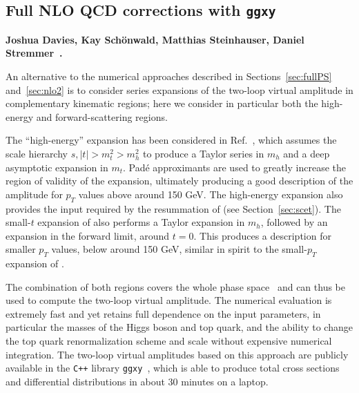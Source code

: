 \subsection{Full NLO QCD corrections with \textbf{\texttt{ggxy}}}


\textbf{Joshua Davies, Kay Schönwald, Matthias Steinhauser, Daniel Stremmer~\cite{Davies:2018qvx,Davies:2023vmj,Davies:2025qjr}.}

\noindent An alternative to the numerical approaches described in Sections~\ref{sec:fullPS} and~\ref{sec:nlo2} is to consider series
expansions of the two-loop virtual amplitude in complementary kinematic regions; here we consider in particular both the high-energy and forward-scattering regions.

The
``high-energy'' expansion has been considered in Ref.~\cite{Davies:2018qvx}, which assumes the
scale hierarchy $s,|t| > m_t^2 > m_h^2$ to produce a Taylor series in $m_h$ and a deep
asymptotic expansion in $m_t$. Pad\'e approximants are used to greatly increase
the region of validity of the expansion, ultimately producing a good description
of the amplitude for $p_T$ values above around 150 GeV. The high-energy expansion
also provides the input required by the resummation of \cite{Jaskiewicz:2024xkd}
(see Section~\ref{sec:scet}).
%
The small-$t$ expansion of \cite{Davies:2023vmj} also performs a Taylor expansion
in $m_h$, followed by an expansion in the forward limit, around $t=0$. This
produces a description for smaller $p_T$ values, below around 150 GeV, similar in
spirit to the small-$p_T$ expansion of \cite{Bonciani:2018omm}.

The combination of both regions
covers the whole phase space~\cite{Davies:2023vmj} and can
thus be used to compute the two-loop
virtual amplitude. The numerical evaluation
is
extremely fast and yet retains full dependence on the input parameters,
in particular the masses of the Higgs boson and top quark, and the ability to change
the top quark renormalization scheme and scale without expensive numerical integration.
The two-loop virtual amplitudes based on this approach are publicly available in the \texttt{C++}
library \texttt{ggxy}~\cite{Davies:2025qjr}, which is able to produce total cross sections and differential distributions in about 30 minutes on a laptop.

